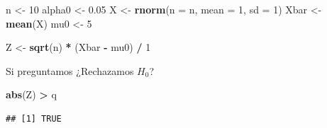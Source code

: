 \documentclass[
  12pt,
]{book}
\newenvironment{Shaded}{\begin{snugshade}}{\end{snugshade}}
\newcommand{\DataTypeTok}[1]{\textcolor[rgb]{0.13,0.29,0.53}{#1}}
\newcommand{\DecValTok}[1]{\textcolor[rgb]{0.00,0.00,0.81}{#1}}
\newcommand{\FloatTok}[1]{\textcolor[rgb]{0.00,0.00,0.81}{#1}}
\newcommand{\KeywordTok}[1]{\textcolor[rgb]{0.13,0.29,0.53}{\textbf{#1}}}
\newcommand{\NormalTok}[1]{#1}
\newcommand{\OperatorTok}[1]{\textcolor[rgb]{0.81,0.36,0.00}{\textbf{#1}}}
\newcommand{\StringTok}[1]{\textcolor[rgb]{0.31,0.60,0.02}{#1}}
\begin{document}
\begin{Shaded}
\begin{Highlighting}[]
\NormalTok{n \textless{}{-}}\StringTok{ }\DecValTok{10}
\NormalTok{alpha0 \textless{}{-}}\StringTok{ }\FloatTok{0.05}
\NormalTok{X \textless{}{-}}\StringTok{ }\KeywordTok{rnorm}\NormalTok{(}\DataTypeTok{n =}\NormalTok{ n, }\DataTypeTok{mean =} \DecValTok{1}\NormalTok{, }\DataTypeTok{sd =} \DecValTok{1}\NormalTok{)}
\NormalTok{Xbar \textless{}{-}}\StringTok{ }\KeywordTok{mean}\NormalTok{(X)}
\NormalTok{mu0 \textless{}{-}}\StringTok{ }\DecValTok{5}

\NormalTok{Z \textless{}{-}}\StringTok{ }\KeywordTok{sqrt}\NormalTok{(n) }\OperatorTok{*}\StringTok{ }\NormalTok{(Xbar }\OperatorTok{{-}}\StringTok{ }\NormalTok{mu0) }\OperatorTok{/}\StringTok{ }\DecValTok{1}
\end{Highlighting}
\end{Shaded}

Si preguntamos ¿Rechazamos \(H_0\)?

\begin{Shaded}
\begin{Highlighting}[]
\KeywordTok{abs}\NormalTok{(Z) }\OperatorTok{\textgreater{}}\StringTok{ }\NormalTok{q}
\end{Highlighting}
\end{Shaded}

\begin{verbatim}
## [1] TRUE
\end{verbatim}
\end{document}
